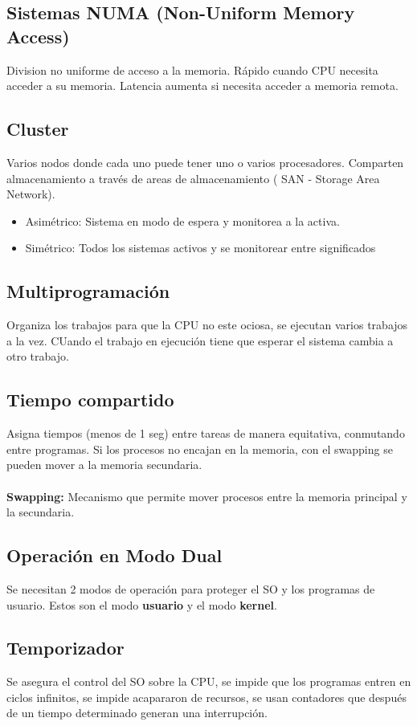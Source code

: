 \documentclass{templateNote}
\begin{document}
\subsection*{Sistemas NUMA (Non-Uniform Memory Access)}
Division no uniforme de acceso a la memoria. Rápido cuando CPU necesita acceder a su memoria. Latencia aumenta si necesita acceder a memoria remota.

\subsection*{Cluster}
Varios nodos donde cada uno puede tener uno o varios procesadores. Comparten almacenamiento a través de areas de almacenamiento ( SAN - Storage Area Network).
\begin{itemize}
    \item Asimétrico: Sistema en modo de espera y monitorea a la activa.
    \item Simétrico: Todos los sistemas activos y se monitorear entre significados
\end{itemize}

\subsection*{Multiprogramación}
Organiza los trabajos para que la CPU no este ociosa, se ejecutan varios trabajos a la vez. CUando el trabajo en ejecución tiene que esperar el sistema cambia a otro trabajo.

\subsection*{Tiempo compartido}
Asigna tiempos (menos de 1 seg) entre tareas de manera equitativa, conmutando entre programas. Si los procesos no encajan en la memoria, con el swapping se pueden mover a la memoria secundaria.
\\\\
\noindent\textbf{Swapping:} Mecanismo que permite mover procesos entre la memoria principal y la secundaria.

\subsection*{Operación en Modo Dual}
Se necesitan 2 modos de operación para proteger el SO y los programas de usuario. Estos son el modo \textbf{usuario} y el modo \textbf{kernel}.

\subsection*{Temporizador}
Se asegura el control del SO sobre la CPU, se impide que los programas entren en ciclos infinitos, se impide acapararon de recursos, se usan contadores que después de un tiempo determinado generan una interrupción.
\end{document}
